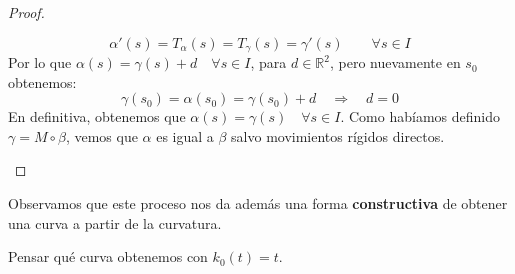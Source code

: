 \begin{teo}
\begin{proof}
\begin{description}
\begin{equation*}
                    \alpha'(s) = T_\alpha(s) = T_\gamma(s) = \gamma'(s) \qquad \forall s\in I
                \end{equation*}
                Por lo que $\alpha(s) = \gamma(s) + d\quad \forall s\in I$, para $d\in \mathbb{R}^2$, pero nuevamente en $s_0$ obtenemos:
                \begin{equation*}
                    \gamma(s_0) = \alpha(s_0) = \gamma(s_0) + d \quad\Longrightarrow\quad d = 0
                \end{equation*}
                En definitiva, obtenemos que $\alpha(s) = \gamma(s)\quad \forall s\in I$. Como habíamos definido $\gamma = M\circ \beta$, vemos que $\alpha$ es igual a $\beta$ salvo movimientos rígidos directos.
        \end{description}
    \end{proof}
\end{teo} 


\noindent
Observamos que este proceso nos da además una forma \textbf{constructiva} de obtener una curva a partir de la curvatura.

\begin{ejercicio} %
    Pensar qué curva obtenemos con $k_0(t) = t$.
\end{ejercicio}

